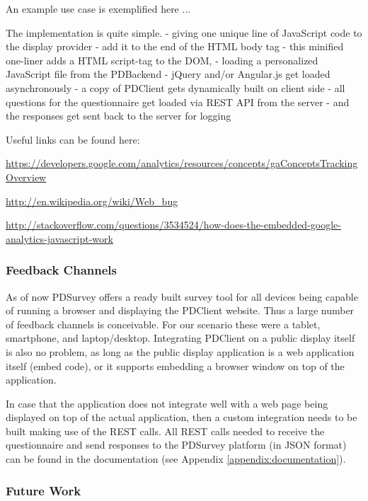 		An example use case is exemplified here ...



		The implementation is quite simple. 
		 - giving one unique line of JavaScript code to the display provider
		 - add it to the end of the HTML body tag
		 - this minified one-liner adds a HTML script-tag to the DOM,
		 - loading a personalized JavaScript file from the PDBackend
		 - jQuery and/or Angular.js get loaded asynchronously
		 - a copy of PDClient gets dynamically built on client side
		 - all questions for the questionnaire get loaded via REST API from the server
		 - and the responses get sent back to the server for logging

		Useful links can be found here:

		\url{https://developers.google.com/analytics/resources/concepts/gaConceptsTrackingOverview}

		\url{http://en.wikipedia.org/wiki/Web_bug}

		\url{http://stackoverflow.com/questions/3534524/how-does-the-embedded-google-analytics-javascript-work}

	\subsubsection{Feedback Channels}

	As of now PDSurvey offers a ready built survey tool for all devices being capable of running a browser and displaying the PDClient website. Thus a large number of feedback channels is conceivable. For our scenario these were a tablet, smartphone, and laptop/desktop. Integrating PDClient on a public display itself is also no problem, as long as the public display application is a web application itself (embed code), or it supports embedding a browser window on top of the application. 

	In case that the application does not integrate well with a web page being displayed on top of the actual application, then a custom integration needs to be built making use of the REST calls. All REST calls needed to receive the questionnaire and send responses to the PDSurvey platform (in JSON format) can be found in the documentation (see Appendix \ref{appendix:documentation}).



	\subsubsection{Future Work}

